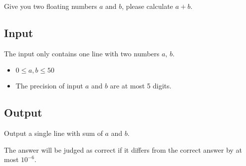 
Give you two floating numbers $a$ and $b$, please calculate $a+b$.

\subsection*{Input}

The input only contains one line with two numbers $a$, $b$.

\begin{itemize}
    \item $0 \leq a, b \leq 50$
    \item The precision of input $a$ and $b$ are at most 5 digits.
\end{itemize}

\subsection*{Output}

Output a single line with sum of $a$ and $b$.

The answer will be judged as correct if it differs from the correct answer by at most $10^{-6}$.

